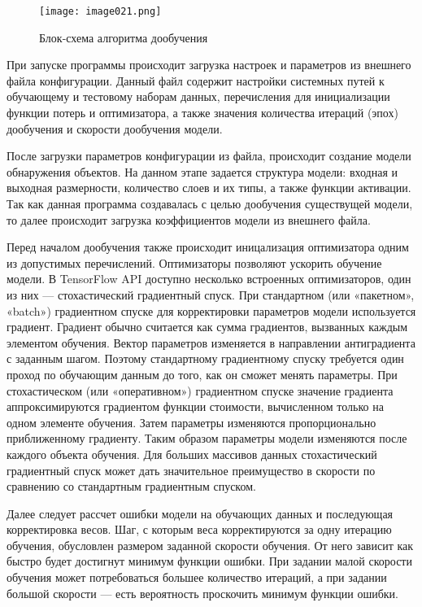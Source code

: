 \begin{figure}[htbp]
\centering
\texttt{[image: image021.png]}
\caption{Блок-схема алгоритма дообучения}%
\label{fig:transferlearningscheme}
\end{figure}

При запуске программы происходит загрузка настроек и параметров из внешнего файла конфигурации. Данный файл содержит настройки системных путей к обучающему и тестовому наборам данных, перечисления для инициализации функции потерь и оптимизатора, а также значения количества итераций (эпох) дообучения и скорости дообучения модели.

После загрузки параметров конфигурации из файла, происходит создание модели обнаружения объектов. На данном этапе задается структура модели: входная и выходная размерности, количество слоев и их типы, а также функции активации. Так как данная программа создавалась с целью дообучения существущей модели, то далее происходит загрузка коэффициентов модели из внешнего файла.

Перед началом дообучения также происходит иницализация оптимизатора одним из допустимых перечислений. Оптимизаторы позволяют ускорить обучение модели. В TensorFlow API доступно несколько встроенных оптимизаторов, один из них — стохастический градиентный спуск. При стандартном (или «пакетном», «batch») градиентном спуске для корректировки параметров модели используется градиент. Градиент обычно считается как сумма градиентов, вызванных каждым элементом обучения. Вектор параметров изменяется в направлении антиградиента с заданным шагом. Поэтому стандартному градиентному спуску требуется один проход по обучающим данным до того, как он сможет менять параметры. При стохастическом (или «оперативном») градиентном спуске значение градиента аппроксимируются градиентом функции стоимости, вычисленном только на одном элементе обучения. Затем параметры изменяются пропорционально приближенному градиенту. Таким образом параметры модели изменяются после каждого объекта обучения. Для больших массивов данных стохастический градиентный спуск может дать значительное преимущество в скорости по сравнению со стандартным градиентным спуском\cite{eighteen}. 

Далее следует рассчет ошибки модели на обучающих данных и последующая корректировка весов. Шаг, с которым веса корректируются за одну итерацию обучения, обусловлен размером заданной скорости обучения. От него зависит как быстро будет достигнут минимум функции ошибки. При задании малой скорости обучения может потребоваться большее количество итераций, а при задании большой скорости — есть вероятность проскочить минимум функции ошибки.

